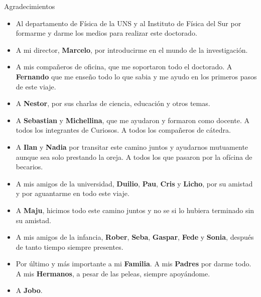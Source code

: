 \documentclass[8pt]{beamer}
\begin{document}
\begin{frame}[t]{Agradecimientos}
\small
\begin{itemize}
    \item<1-> Al departamento de Física de la UNS y al Instituto de Física del Sur por formarme y darme los medios para realizar este doctorado.
    \item<2-> A mi director, \textbf{Marcelo}, por introducirme en el mundo de la investigación.
    \item<3-> A mis compañeros de oficina, que me soportaron todo el doctorado. A \textbf{Fernando} que me enseño todo lo que sabia y me ayudo en los primeros pasos de este viaje.
    \item<4-> A \textbf{Nestor}, por sus charlas de ciencia, educación y otros temas.
    \item<5-> A \textbf{Sebastian} y \textbf{Michellina}, que me ayudaron y formaron como docente. A todos los integrantes de Curiosos. A todos los compañeros de cátedra.
    \item<6-> A \textbf{Ilan} y \textbf{Nadia} por transitar este camino juntos y ayudarnos mutuamente aunque sea solo prestando la oreja. A todos los que pasaron por la ofícina de becarios.
    \item<7-> A mis amigos de la universidad, \textbf{Duilio}, \textbf{Pau}, \textbf{Cris} y \textbf{Licho}, por su amistad y por aguantarme en todo este viaje.
    \item<8-> A \textbf{Maju}, hicimos todo este camino juntos y no se si lo hubiera terminado sin su amistad.
    \item<9-> A mis amigos de la infancia, \textbf{Rober}, \textbf{Seba}, \textbf{Gaspar}, \textbf{Fede} y \textbf{Sonia}, después de
tanto tiempo siempre presentes.
    \item<10-> Por último y más importante a mi \textbf{Familia}. A mis \textbf{Padres} por darme todo. A mis
\textbf{Hermanos}, a pesar de las peleas, siempre apoyándome.
    \item<11-> A \textbf{Jobo}.
\end{itemize}
\end{frame}
\end{document}
